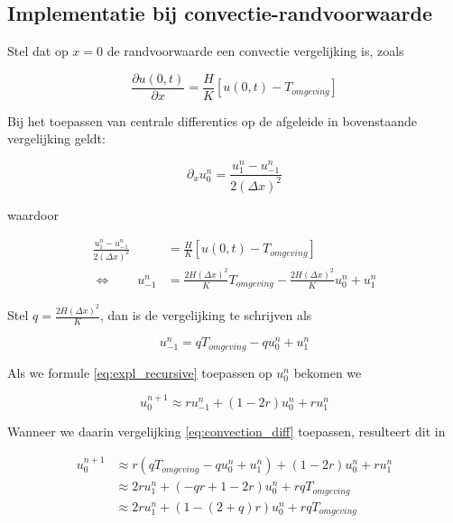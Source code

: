 \documentclass[a4paper,kulak]{kulakarticle} %
\begin{document}
\subsection{Implementatie bij convectie-randvoorwaarde}

Stel dat op $x = 0$ de randvoorwaarde een convectie vergelijking is, zoals

\begin{equation*}
	\frac{\partial u(0, t)}{\partial x} = \frac{H}{K}\left[u(0, t) - T_{omgeving}\right]
\end{equation*}

Bij het toepassen van centrale differenties op de afgeleide in bovenstaande vergelijking geldt:

\begin{equation*}
	\partial_x u_0^n = \frac{u_1^n - u_{-1}^n}{2(\Delta x)^2}
\end{equation*}

waardoor

\begin{align*}
	\frac{u_1^n - u_{-1}^n}{2(\Delta x)^2} &= \frac{H}{K}\left[u(0, t) - T_{omgeving}\right] \\
	\Leftrightarrow \qquad
	u_{-1}^n &= 
	\frac{2 H (\Delta x)^2}{K} T_{omgeving} 
	- \frac{2 H (\Delta x)^2}{K} u_0^n
	+ u_1^n
\end{align*}

Stel $q = \frac{2 H (\Delta x)^2}{K}$, dan is de vergelijking te schrijven als

\begin{equation}
	u_{-1}^n = q T_{omgeving} - q u_0^n + u_1^n
	\label{eq:convection_diff}
\end{equation}

Als we formule \ref{eq:expl_recursive} toepassen op $u_0^n$ bekomen we

\begin{equation*}
	u_0^{n+1} \approx r u_{-1}^n + \left( 1 - 2r \right) u_0^n + r u_1^n 
\end{equation*}

Wanneer we daarin vergelijking \ref{eq:convection_diff} toepassen, resulteert dit in

\begin{align*}
	u_0^{n+1} 
	&\approx r \left(q T_{omgeving} - q u_0^n + u_1^n\right) 
	+ \left( 1 - 2r \right) u_0^n 
	+ r u_1^n \\
	&\approx 2 r u_1^n
	+ ( - q r + 1 - 2 r ) u_0^n
	+ r q T_{omgeving} \\
	&\approx 2 r u_1^n
	+ (1 - (2 + q)r) u_0^n
	+ r q T_{omgeving}
\end{align*}
\end{document}
